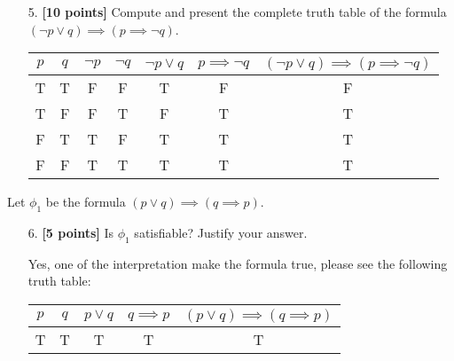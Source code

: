 \documentclass{article}
\begin{document}
\begin{enumerate}
\item[5.] \textbf{[10 points]} Compute and present the complete truth
  table of the formula $(\neg p \lor q) \implies (p \implies \neg q)$.
  
   \begin{answer}    
     \begin{tabular}{|c|c|c|c|c|c|c|} \hline
        $p$ & $q$ & $\neg p$ & $\neg q$ & $\neg p \lor q$ & $p \implies \neg q$ & $(\neg p \lor q) \implies (p \implies \neg q)$\\ \hline
        T & T & F & F & T & F & F \\ \hline
        T & F & F & T & F & T & T\\ \hline
        F & T & T & F & T & T & T\\ \hline
        F & F & T & T & T & T & T\\ \hline
    \end{tabular}
    \end{answer}
\end{enumerate}

\noindent
Let $\phi_1$ be the formula $(p \lor q) \implies (q \implies p)$.

\begin{enumerate}
\item[6.]  \textbf{[5 points]} Is $\phi_1$ satisfiable?  Justify your answer.
  
   \begin{answer}
    Yes, one of the interpretation make the formula true, please see the following truth table:\\
     \begin{tabular}{|c|c|c|c|c|} \hline
        $p$ & $q$ & $ p \lor q$ & $q \implies p$ & $(p \lor q) \implies (q \implies p)$ \\ \hline
        T & T & T & T & T \\ \hline
    \end{tabular}
    \end{answer}
    
\end{enumerate}
\end{document}
